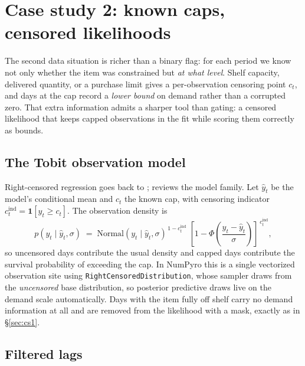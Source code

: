 \section{Case study 2: known caps, censored likelihoods}\label{sec:cs2}

The second data situation is richer than a binary flag: for each period we know not only whether the item was constrained but \emph{at what level}. Shelf capacity, delivered quantity, or a purchase limit gives a per-observation censoring point $c_t$, and days at the cap record a \emph{lower bound} on demand rather than a corrupted zero. That extra information admits a sharper tool than gating: a censored likelihood that keeps capped observations in the fit while scoring them correctly as bounds.

\subsection{The Tobit observation model}\label{sec:tobit}

Right-censored regression goes back to \citet{tobin1958estimation}; \citet{amemiya1984tobit} reviews the model family. Let $\hat{y}_t$ be the model's conditional mean and $c_t$ the known cap, with censoring indicator $c^{\text{ind}}_t = \mathbf{1}[y_t \geq c_t]$. The observation density is
\begin{equation}\label{eq:tobit}
p(y_t \mid \hat{y}_t, \sigma) \;=\; \text{Normal}(y_t \mid \hat{y}_t, \sigma)^{\,1 - c^{\text{ind}}_t} \; \left[ 1 - \Phi\!\left( \frac{y_t - \hat{y}_t}{\sigma} \right) \right]^{\,c^{\text{ind}}_t},
\end{equation}
so uncensored days contribute the usual density and capped days contribute the survival probability of exceeding the cap. In NumPyro this is a single vectorized observation site using \texttt{RightCensoredDistribution}, whose sampler draws from the \emph{uncensored} base distribution, so posterior predictive draws live on the demand scale automatically. Days with the item fully off shelf carry no demand information at all and are removed from the likelihood with a mask, exactly as in \S\ref{sec:cs1}.

\subsection{Filtered lags}\label{sec:lag-filter}

